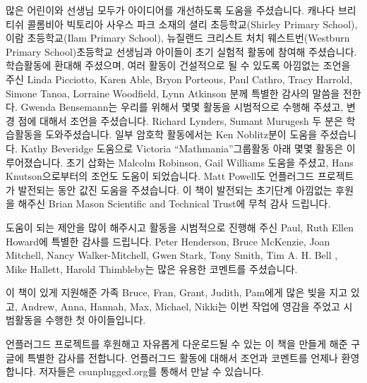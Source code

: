 \documentclass[]{article}
\begin{document}

많은 어린이와 선생님 모두가 아이디어를 개선하도록 도움을 주셨습니다.
캐나다 브리티쉬 콜롬비아 빅토리아 사우스 파크 소재의 셜리
초등학교(Shirley Primary School), 이람 초등학교(Ilam Primary School),
뉴질랜드 크리스트 처치 웨스트번(Westburn Primary School)초등학교
선생님과 아이들이 초기 실험적 활동에 참여해 주셨습니다. 학습활동에
환대해 주셨으며, 여러 활동이 건설적으로 될 수 있도록 아낌없는 조언을
주신 Linda Picciotto, Karen Able, Bryon Porteous, Paul Cathro, Tracy
Harrold, Simone Tanoa, Lorraine Woodfield, Lynn Atkinson 분께 특별한
감사의 말씀을 전한다. Gwenda Bensemann는 우리를 위해서 몇몇 활동을
시범적으로 수행해 주셨고, 변경 점에 대해서 조언을 주셨습니다. Richard
Lynders, Sumant Murugesh 두 분은 학습활동을 도와주셨습니다. 일부 암호학
활동에서는 Ken Noblitz분이 도움을 주셨습니다. Kathy Beveridge 도움으로
Victoria ``Mathmania''그룹활동 아래 몇몇 활동은 이루어졌습니다. 초기
삽화는 Malcolm Robinson, Gail Williams 도움을 주셨고, Hans
Knutson으로부터의 조언도 도움이 되었습니다. Matt Powell도 언플러그드
프로젝트가 발전되는 동안 값진 도움을 주셨습니다. 이 책이 발전되는
초기단계 아낌없는 후원을 해주신 Brian Mason Scientific and Technical
Trust에 무척 감사 드립니다.

도움이 되는 제안을 많이 해주시고 활동을 시범적으로 진행해 주신 Paul,
Ruth Ellen Howard에 특별한 감사를 드립니다. Peter Henderson, Bruce
McKenzie, Joan Mitchell, Nancy Walker-Mitchell, Gwen Stark, Tony Smith,
Tim A. H. Bell , Mike Hallett, Harold Thimbleby는 많은 유용한 코멘트를
주셨습니다.

이 책이 있게 지원해준 가족 Bruce, Fran, Grant, Judith, Pam에게 많은 빚을
지고 있고, Andrew, Anna, Hannah, Max, Michael, Nikki는 이번 작업에
영감을 주었고 시범활동을 수행한 첫 아이들입니다.

언플러그드 프로젝트를 후원해고 자유롭게 다운로드될 수 있는 이 책을
만들게 해준 구글에 특별한 감사를 전합니다. 언플러그드 활동에 대해서
조언과 코멘트를 언제나 환영합니다. 저자들은 csunplugged.org를 통해서
만날 수 있습니다.

\end{document}
